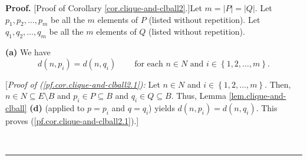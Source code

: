 \documentclass[numbers=enddot,12pt,final,onecolumn,notitlepage]{scrartcl}%
\theoremstyle{definition}
\newenvironment{proof}[1][Proof]{\noindent\textbf{#1.} }{\ \rule{0.5em}{0.5em}}
\theoremstyle{plainsl}
\begin{document}
\begin{proof}
[Proof of Corollary \ref{cor.clique-and-clball2}.]Let $m=\left\vert
P\right\vert =\left\vert Q\right\vert $. Let $p_{1},p_{2},\ldots,p_{m}$ be all
the $m$ elements of $P$ (listed without repetition). Let $q_{1},q_{2}%
,\ldots,q_{m}$ be all the $m$ elements of $Q$ (listed without repetition).
\medskip

\textbf{(a)} We have%
\begin{equation}
d\left(  n,p_{i}\right)  =d\left(  n,q_{i}\right)
\ \ \ \ \ \ \ \ \ \ \text{for each }n\in N\text{ and }i\in\left\{
1,2,\ldots,m\right\}  . \label{pf.cor.clique-and-clball2.1}%
\end{equation}


[\textit{Proof of (\ref{pf.cor.clique-and-clball2.1}):} Let $n\in N$ and
$i\in\left\{  1,2,\ldots,m\right\}  $. Then, $n\in N\subseteq E\setminus B$
and $p_{i}\in P\subseteq B$ and $q_{i}\in Q\subseteq B$. Thus, Lemma
\ref{lem.clique-and-clball} \textbf{(d)} (applied to $p=p_{i}$ and $q=q_{i}$)
yields $d\left(  n,p_{i}\right)  =d\left(  n,q_{i}\right)  $. This proves
(\ref{pf.cor.clique-and-clball2.1}).]


\end{proof}
\end{document}
